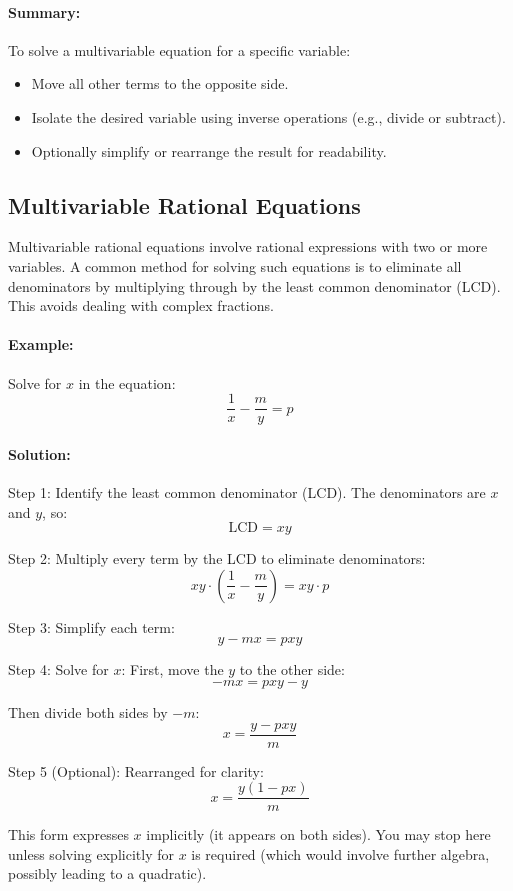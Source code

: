 \documentclass[11pt]{article}
\begin{document}
\paragraph{Summary:}
To solve a multivariable equation for a specific variable:
\begin{itemize}
  \item Move all other terms to the opposite side.
  \item Isolate the desired variable using inverse operations (e.g., divide or subtract).
  \item Optionally simplify or rearrange the result for readability.
\end{itemize}

\subsection{Multivariable Rational Equations}

Multivariable rational equations involve rational expressions with two or more variables. A common method for solving such equations is to eliminate all denominators by multiplying through by the least common denominator (LCD). This avoids dealing with complex fractions.

\paragraph{Example:} Solve for \( x \) in the equation:
\[
\frac{1}{x} - \frac{m}{y} = p
\]

\paragraph{Solution:}

Step 1: Identify the least common denominator (LCD).
The denominators are \( x \) and \( y \), so:
\[
\text{LCD} = xy
\]

Step 2: Multiply every term by the LCD to eliminate denominators:
\[
xy \cdot \left( \frac{1}{x} - \frac{m}{y} \right) = xy \cdot p
\]

Step 3: Simplify each term:
\[
y - mx = pxy
\]

Step 4: Solve for \( x \):
First, move the \( y \) to the other side:
\[
- mx = pxy - y
\]

Then divide both sides by \( -m \):
\[
x = \frac{y - pxy}{m}
\]

Step 5 (Optional): Rearranged for clarity:
\[
x = \frac{y(1 - px)}{m}
\]

This form expresses \( x \) implicitly (it appears on both sides). You may stop here unless solving explicitly for \( x \) is required (which would involve further algebra, possibly leading to a quadratic).
\end{document}
